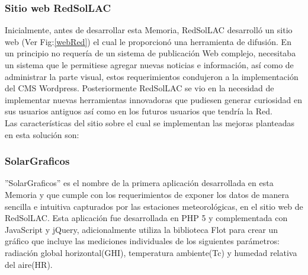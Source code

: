 \subsubsection{Sitio web RedSolLAC}
Inicialmente, antes de desarrollar esta Memoria, RedSolLAC desarrolló un sitio web (Ver Fig:\ref{webRed}) el cual le proporcionó una herramienta de difusión. En un principio no requería de un sistema de publicación Web complejo, necesitaba un sistema que le permitiese agregar nuevas noticias e información, así como de administrar la parte visual, estos requerimientos condujeron a la implementación del CMS Wordpress. Posteriormente RedSolLAC se vio en la necesidad de implementar nuevas herramientas innovadoras que pudiesen generar curiosidad en sus usuarios antiguos así como en los futuros usuarios que tendría la Red.\\
Las características del sitio sobre el cual se implementan las mejoras planteadas en esta solución son:
\begin{table}[h!]
\caption{Características sitio Web RedSolLAC}
\end{table}

\newpage
\subsubsection{SolarGraficos}
''SolarGraficos'' es el nombre de la primera aplicación desarrollada en esta Memoria y que cumple con los requerimientos de exponer los datos de manera sencilla e intuitiva capturados por las estaciones meteorológicas, en el sitio web de RedSolLAC. Esta aplicación fue desarrollada en PHP 5 y complementada con JavaScript y jQuery, adicionalmente utiliza la biblioteca Flot para crear un gráfico que incluye las mediciones individuales de los siguientes parámetros: radiación global horizontal(GHI), temperatura ambiente(Tc) y humedad relativa del aire(HR).\\

